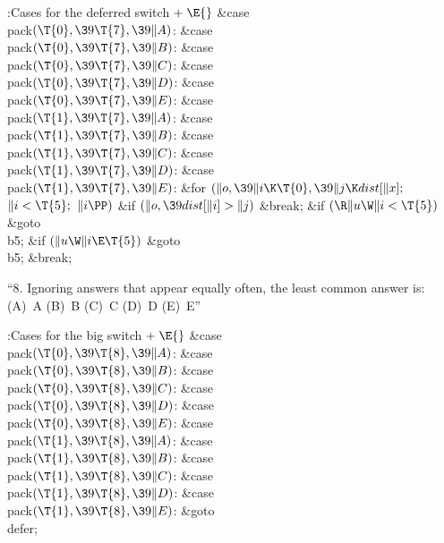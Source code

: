 \B{}:Cases for the deferred switch\X${}\mathrel+\E{}$\6
\4\&{case} \\{pack}${}(\T{0},\39\T{7},\39\|A){}$:\5
\&{case} \\{pack}${}(\T{0},\39\T{7},\39\|B){}$:\5
\&{case} \\{pack}${}(\T{0},\39\T{7},\39\|C){}$:\5
\&{case} \\{pack}${}(\T{0},\39\T{7},\39\|D){}$:\5
\&{case} \\{pack}${}(\T{0},\39\T{7},\39\|E){}$:\5
\&{case} \\{pack}${}(\T{1},\39\T{7},\39\|A){}$:\5
\&{case} \\{pack}${}(\T{1},\39\T{7},\39\|B){}$:\5
\&{case} \\{pack}${}(\T{1},\39\T{7},\39\|C){}$:\5
\&{case} \\{pack}${}(\T{1},\39\T{7},\39\|D){}$:\5
\&{case} \\{pack}${}(\T{1},\39\T{7},\39\|E){}$:\5
\&{for} ${}(\|o,\39\|i\K\T{0},\39\|j\K\\{dist}[\|x];{}$ ${}\|i<\T{5};{}$ ${}\|i%
\PP){}$\1\6
\&{if} ${}(\|o,\39\\{dist}[\|i]>\|j){}$\1\5
\&{break};\2\2\6
\&{if} ${}(\R\|u\W\|i<\T{5}){}$\1\5
\&{goto} \\{b5};\2\6
\&{if} ${}(\|u\W\|i\E\T{5}){}$\1\5
\&{goto} \\{b5};\5
\2\&{break};\par
\fi

``8. Ignoring answers that appear equally often, the
least common answer is:
(A)~A (B)~B (C)~C (D)~D (E)~E''

\Y\B\4:Cases for the big switch\X${}\mathrel+\E{}$\6
\4\&{case} \\{pack}${}(\T{0},\39\T{8},\39\|A){}$:\5
\&{case} \\{pack}${}(\T{0},\39\T{8},\39\|B){}$:\5
\&{case} \\{pack}${}(\T{0},\39\T{8},\39\|C){}$:\5
\&{case} \\{pack}${}(\T{0},\39\T{8},\39\|D){}$:\5
\&{case} \\{pack}${}(\T{0},\39\T{8},\39\|E){}$:\5
\&{case} \\{pack}${}(\T{1},\39\T{8},\39\|A){}$:\5
\&{case} \\{pack}${}(\T{1},\39\T{8},\39\|B){}$:\5
\&{case} \\{pack}${}(\T{1},\39\T{8},\39\|C){}$:\5
\&{case} \\{pack}${}(\T{1},\39\T{8},\39\|D){}$:\5
\&{case} \\{pack}${}(\T{1},\39\T{8},\39\|E){}$:\5
\&{goto} \\{defer};\par
\fi

